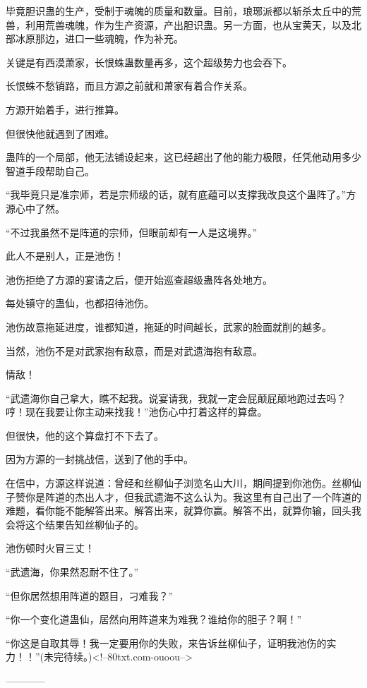 \begin{this_body}
毕竟胆识蛊的生产，受制于魂魄的质量和数量。目前，琅琊派都以斩杀太丘中的荒兽，利用荒兽魂魄，作为生产资源，产出胆识蛊。另一方面，也从宝黄天，以及北部冰原那边，进口一些魂魄，作为补充。

关键是有西漠萧家，长恨蛛蛊数量再多，这个超级势力也会吞下。

长恨蛛不愁销路，而且方源之前就和萧家有着合作关系。

方源开始着手，进行推算。

但很快他就遇到了困难。

蛊阵的一个局部，他无法铺设起来，这已经超出了他的能力极限，任凭他动用多少智道手段帮助自己。

“我毕竟只是准宗师，若是宗师级的话，就有底蕴可以支撑我改良这个蛊阵了。”方源心中了然。

“不过我虽然不是阵道的宗师，但眼前却有一人是这境界。”

此人不是别人，正是池伤！

池伤拒绝了方源的宴请之后，便开始巡查超级蛊阵各处地方。

每处镇守的蛊仙，也都招待池伤。

池伤故意拖延进度，谁都知道，拖延的时间越长，武家的脸面就削的越多。

当然，池伤不是对武家抱有敌意，而是对武遗海抱有敌意。

情敌！

“武遗海你自己拿大，瞧不起我。说宴请我，我就一定会屁颠屁颠地跑过去吗？哼！现在我要让你主动来找我！”池伤心中打着这样的算盘。

但很快，他的这个算盘打不下去了。

因为方源的一封挑战信，送到了他的手中。

在信中，方源这样说道：曾经和丝柳仙子浏览名山大川，期间提到你池伤。丝柳仙子赞你是阵道的杰出人才，但我武遗海不这么认为。我这里有自己出了一个阵道的难题，看你能不能解答出来。解答出来，就算你赢。解答不出，就算你输，回头我会将这个结果告知丝柳仙子的。

池伤顿时火冒三丈！

“武遗海，你果然忍耐不住了。”

“但你居然想用阵道的题目，刁难我？”

“你一个变化道蛊仙，居然向用阵道来为难我？谁给你的胆子？啊！”

“你这是自取其辱！我一定要用你的失败，来告诉丝柳仙子，证明我池伤的实力！！”(未完待续。)<!--80txt.com-ouoou-->

------------

\end{this_body}

